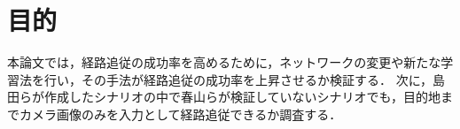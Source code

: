 \section{目的}
本論文では，経路追従の成功率を高めるために，ネットワークの変更や新たな学習法を行い，その手法が経路追従の成功率を上昇させるか検証する．
次に，島田らが作成したシナリオの中で春山らが検証していないシナリオでも，目的地までカメラ画像のみを入力として経路追従できるか調査する．